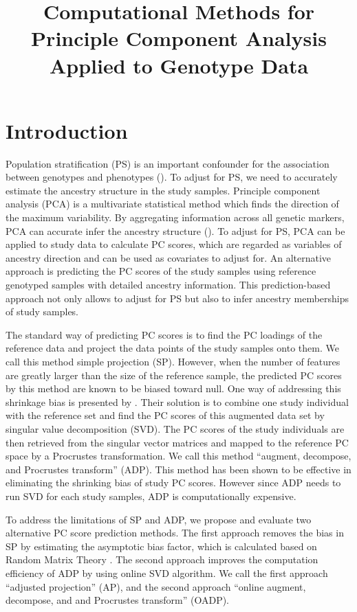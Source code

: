 \documentclass{article}
\title{Computational Methods for Principle Component Analysis Applied to
  Genotype Data}
\date{}
\begin{document}
\maketitle

\section{Introduction}

Population stratification (PS) is an important confounder for the association  between
genotypes and phenotypes (\cite{price2006principal}).
To adjust for PS, we need to accurately estimate the ancestry structure in the study samples. Principle component analysis (PCA) is a multivariate statistical method which finds the direction of the maximum variability. By aggregating information across all genetic markers, PCA can accurate infer the ancestry structure  (\cite{reich}). To adjust for PS, PCA can be applied to study data to calculate PC scores, which are regarded as variables of ancestry direction and can be used as covariates to adjust for. An alternative approach is predicting the PC scores of the study samples using reference genotyped samples with detailed ancestry information.
This prediction-based approach not only allows to adjust for PS but also to infer ancestry memberships of study samples. 

The standard way of predicting PC scores is to find the PC loadings of the reference data and project the data points of the study samples onto them.
We call this method simple projection (SP).
However, when the number of features are greatly larger than the size of the reference sample,
the predicted PC scores by this method are known to be biased toward null.
One way of addressing this shrinkage bias is presented by \cite{wang}.
Their solution is to combine one study individual with the reference set and
find the PC scores of this augmented data set by singular value decomposition (SVD).
The PC scores of the study individuals are then retrieved from the singular vector matrices and mapped to the reference PC space by a Procrustes transformation.
We call this method ``augment, decompose, and Procrustes transform'' (ADP).
This method has been shown to be effective in eliminating the shrinking bias of
study PC scores.
However since ADP needs to run SVD for each study samples, ADP is computationally expensive.

To address the limitations of SP and ADP,
we propose and evaluate two alternative PC score prediction methods.
The first approach removes the bias in SP by estimating the asymptotic bias factor,
which is calculated based on Random Matrix Theory \cite{dey}.
The second approach improves the computation efficiency of ADP by using online SVD algorithm. 
We call the first approach ``adjusted projection'' (AP), and the second approach ``online augment, decompose, and and Procrustes transform'' (OADP). 
\end{document}
